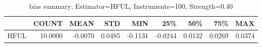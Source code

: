 \begin{table}[ht]
\centering
\caption{bias summary: Estimator=HFUL, Instruments=100, Strength=0.40}
\begin{tabular}{lrrrrrrrr}
\toprule
 & COUNT & MEAN & STD & MIN & 25\% & 50\% & 75\% & MAX \\
\midrule
HFUL & 10.0000 & -0.0070 & 0.0485 & -0.1131 & -0.0244 & 0.0132 & 0.0269 & 0.0374 \\
\bottomrule
\end{tabular}
\end{table}
